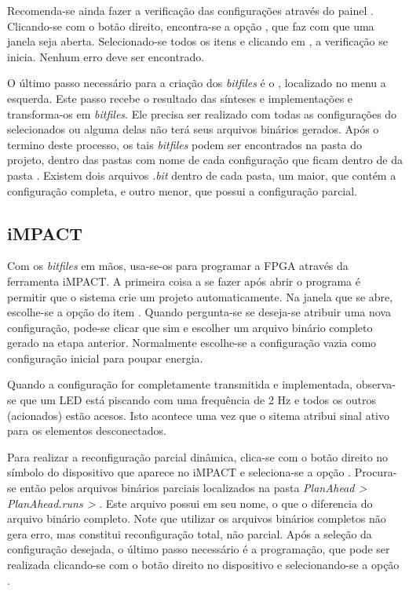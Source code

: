 \documentclass[11pt,a4paper,oneside]{book}
\begin{document}
Recomenda-se ainda fazer a verificação das configurações através do painel .
Clicando-se com o botão direito, encontra-se a opção , que faz com que uma janela seja aberta.
Selecionado-se todos os itens e clicando em , a verificação se inicia.
Nenhum erro deve ser encontrado.

O último passo necessário para a criação dos \textit{bitfiles} é o , localizado no menu a esquerda.
Este passo recebe o resultado das sínteses e implementações e transforma-os em \textit{bitfiles}.
Ele precisa ser realizado com todas as configurações do  selecionados ou alguma delas não terá seus arquivos binários gerados.
Após o termino deste processo, os tais \textit{bitfiles} podem ser encontrados na pasta do projeto, dentro das pastas com nome de cada configuração que ficam dentro de da pasta .
Existem dois arquivos \textit{.bit} dentro de cada pasta, um maior, que contém a configuração completa, e outro menor, que possui a configuração parcial.

\subsection{iMPACT}
Com os \textit{bitfiles} em mãos, usa-se-os para programar a FPGA através da ferramenta iMPACT. 
A primeira coisa a se fazer após abrir o programa é permitir que o sistema crie um projeto automaticamente.
Na janela que se abre, escolhe-se a opção  do item .
Quando pergunta-se se deseja-se atribuir uma nova configuração, pode-se clicar que sim e escolher um arquivo binário completo gerado na etapa anterior.
Normalmente escolhe-se a configuração vazia como configuração inicial para poupar energia.

Quando a configuração for completamente transmitida e implementada, observa-se que um LED está piscando com uma frequência de 2 Hz e todos os outros (acionados) estão acesos.
Isto acontece uma vez que o sitema atribui sinal ativo para os elementos desconectados.

Para realizar a reconfiguração parcial dinâmica, clica-se com o botão direito no símbolo do dispositivo que aparece no iMPACT e seleciona-se a opção .
Procura-se então pelos arquivos binários parciais localizados na pasta \textit{PlanAhead > PlanAhead.runs >} .
Este arquivo possui  em seu nome, o que o diferencia do arquivo binário completo.
Note que utilizar os arquivos binários completos não gera erro, mas constitui reconfiguração total, não parcial.
Após a seleção da configuração desejada, o último passo necessário é a programação, que pode ser realizada clicando-se com o botão direito no dispositivo e selecionando-se a opção .
\end{document}
